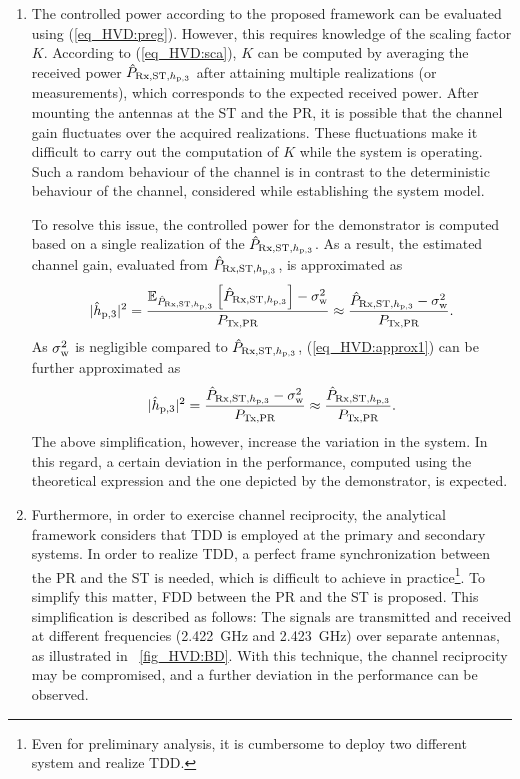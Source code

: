 \begin{enumerate}
	\item The controlled power according to the proposed framework can be evaluated using (\ref{eq_HVD:preg}). However, this requires knowledge of the scaling factor $K$. According to (\ref{eq_HVD:sca}), $K$ can be computed by averaging the received power $\hat{P}_{\text{Rx,ST,$h_{\text{p,3}}$}}$ after attaining multiple realizations (or measurements), which corresponds to the expected received power. After mounting the antennas at the ST and the PR, it is possible that the channel gain fluctuates over the acquired realizations. These fluctuations make it difficult to carry out the computation of $K$ while the system is operating. Such a random behaviour of the channel is in contrast to the deterministic behaviour of the channel, considered while establishing the system model. 

To resolve this issue, the controlled power for the demonstrator is computed based on a single realization of the $\hat{P}_{\text{Rx,ST,$h_{\text{p,3}}$}}$. As a result, the estimated channel gain, evaluated from $\hat{P}_{\text{Rx,ST,$h_{\text{p,3}}$}}$, is approximated as 
	\begin{equation}
		|\hat{h}_{\text{p,3}}|^2 = \frac{{\mathbb E}_{\hat{P}_{\text{Rx,ST,$h_{\text{p,3}}$}}}\left[ \hat{P}_{\text{Rx,ST,$h_{\text{p,3}}$}} \right]-\sigma^2_{\text{w}}}{P_{\text{Tx,PR}}} \approx \frac{\hat{P}_{\text{Rx,ST,$h_{\text{p,3}}$}}-\sigma^2_{\text{w}}}{P_{\text{Tx,PR}}}. 
		\label{eq_HVD:approx1}
	\end{equation}	
As $\sigma^2_{\text{w}}$ is negligible compared to $\hat{P}_{\text{Rx,ST,$h_{\text{p,3}}$}}$, (\ref{eq_HVD:approx1}) can be further approximated as 
	\begin{equation}
		|\hat{h}_{\text{p,3}}|^2 = \frac{\hat{P}_{\text{Rx,ST,$h_{\text{p,3}}$}}-\sigma^2_{\text{w}}}{P_{\text{Tx,PR}}} \approx \frac{\hat{P}_{\text{Rx,ST,$h_{\text{p,3}}$}}}{P_{\text{Tx,PR}}}.
		\label{eq_HVD:approx2}
	\end{equation}	
The above simplification, however, increase the variation in the system. In this regard, a certain deviation in the performance, computed using the theoretical expression and the one depicted by the demonstrator, is expected. 
	\item Furthermore, in order to exercise channel reciprocity, the analytical framework considers that TDD is employed at the primary and secondary systems. In order to realize TDD, a perfect frame synchronization between the PR and the ST is needed, which is difficult to achieve in practice\footnote{Even for preliminary analysis, it is cumbersome to deploy two different system and realize TDD.}. To simplify this matter, FDD between the PR and the ST is proposed. This simplification is described as follows: The signals are transmitted and received at different frequencies (\SI{2.422}{GHz} and \SI{2.423}{GHz}) over separate antennas, as illustrated in \figurename~\ref{fig_HVD:BD}. With this technique, the channel reciprocity may be compromised, and a further deviation in the performance can be observed.	
\end{enumerate}

